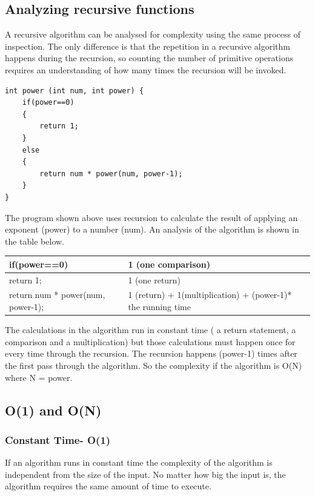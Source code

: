 \subsection{Analyzing recursive functions}

A recursive algorithm can be analysed for complexity using the same process of inspection.   The only difference is that the repetition in a recursive algorithm happens during the recursion,  so counting the number of primitive operations requires an understanding of how many times the recursion will be invoked.

\begin{lstlisting}
int power (int num, int power) {
    if(power==0)
    {
        return 1;
    }
    else
    {
        return num * power(num, power-1);
    }
}
\end{lstlisting}

The program  shown above uses recursion to calculate the result of applying an exponent (power) to a number (num).   
An analysis of the algorithm is shown in the table below.

\begin{tabular}{l|l}
 if(power==0) & 1 (one comparison)\\ \hline
       return 1; &  1 (one return)\\ \hline
       return num * power(num, power-1); & 1 (return) + 1(multiplication) + (power-1)* the running time \\\hline
\end{tabular}

The calculations in the algorithm run in constant time ( a return statement, a comparison and a multiplication)  but those calculations must happen once for every time through the recursion.   The recursion happens (power-1) times after the first pass through the algorithm.   So the complexity if the algorithm is O(N)  where N = power.

\subsection{O(1) and O(N)}

\subsubsection{Constant Time- O(1)}

If an algorithm  runs in constant time the complexity of the algorithm is independent from the size of the
input.  No matter how big the input is, the algorithm requires the same amount of time to execute.

